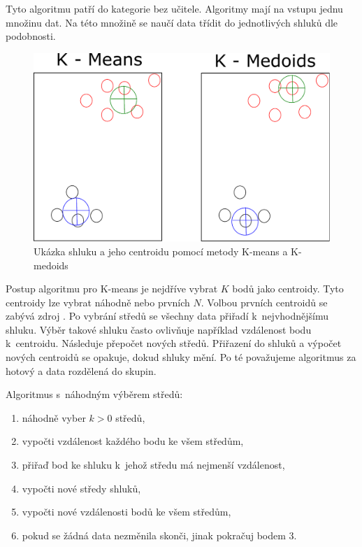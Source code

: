 \documentclass[thesis=M,czech]{FITthesis}[2012/10/20]
\newcommand{\tmpframe}[1]{\fbox{#1}}
\renewcommand{\tmpframe}[1]{#1}
\begin{document}
			Tyto algoritmu patří do kategorie bez učitele. Algoritmy mají na vstupu jednu množinu dat. Na této množině se naučí data třídit do jednotlivých shluků dle podobnosti.
			
			\begin{figure}[htb]\centering
				\tmpframe{\includegraphics[width=\textwidth]{./img/kmeansVSkmedoids}}		
				\caption{Ukázka shluku a jeho centroidu pomocí metody K-means a K-medoids}
				\label{fig:kMeansVSkMedoids}
			\end{figure}
		
			Postup algoritmu pro K-means je nejdříve vybrat $K$ bodů jako centroidy. Tyto centroidy lze vybrat náhodně nebo prvních $N$. Volbou prvních centroidů se zabývá zdroj \cite{kMeansInit}. Po vybrání středů se všechny data přiřadí k~nejvhodnějšímu shluku. Výběr takové shluku často ovlivňuje například vzdálenost bodu k~centroidu. Následuje přepočet nových středů. Přiřazení do shluků a výpočet nových centroidů se opakuje, dokud shluky mění. Po té považujeme algoritmus za hotový a data rozdělená do skupin.
			
			Algoritmus s~náhodným výběrem středů:
			
			\begin{enumerate} 
				\item náhodně vyber $k > 0$ středů,
				\item vypočti vzdálenost každého bodu ke všem středům,
				\item přiřaď bod ke shluku k~jehož středu má nejmenší vzdálenost,
				\item vypočti nové středy shluků,
				\item vypočti nové vzdálenosti bodů ke všem středům,
				\item pokud se žádná data nezměnila skonči, jinak pokračuj bodem 3.
			\end{enumerate}
			
\end{document}
